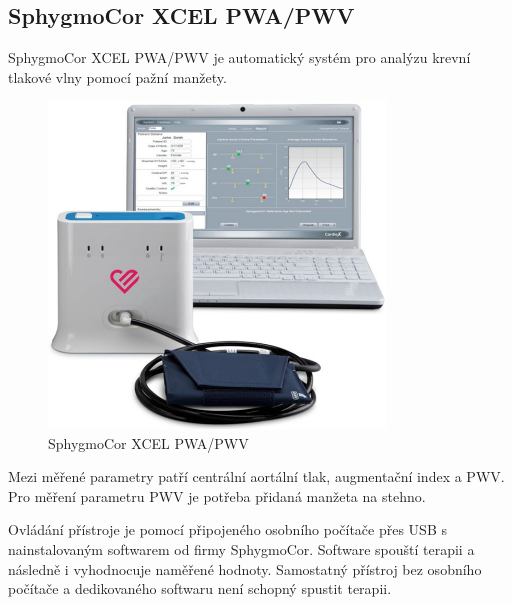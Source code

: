 \subsection{SphygmoCor XCEL PWA/PWV}
SphygmoCor XCEL PWA/PWV je automatický systém pro analýzu krevní tlakové vlny pomocí pažní manžety.
\cite{cite:SphygmoCor}
\begin{figure}[H]
    \caption{SphygmoCor XCEL PWA/PWV \cite{cite:SphygmoCor}}
    \includegraphics[width=0.8\textwidth]{pictures/XCEL_System.jpg}
\end{figure}
Mezi měřené parametry patří centrální aortální tlak, augmentační index a PWV. Pro měření parametru PWV je potřeba přidaná manžeta na stehno.
\cite{cite:SphygmoCor}
\par
Ovládání přístroje je pomocí připojeného osobního počítače přes USB s nainstalovaným softwarem od firmy SphygmoCor. Software spouští terapii a následně i vyhodnocuje naměřené hodnoty. Samostatný přístroj bez osobního počítače a dedikovaného softwaru není schopný spustit terapii.
\cite{cite:SphygmoCor}
